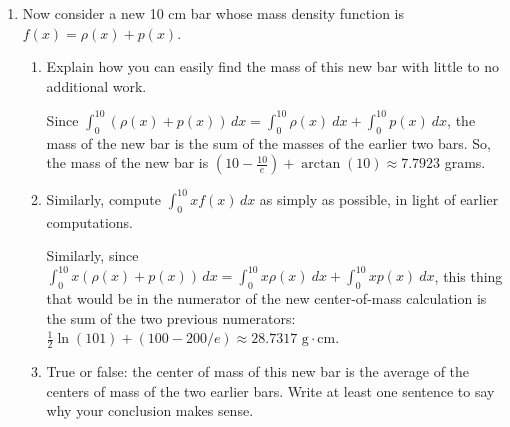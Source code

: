 \documentclass[10pt]{article}
\newenvironment{red}{\color{red}}{\ignorespacesafterend}
\begin{document}
\begin{enumerate}[leftmargin=0pt]
\begin{enumerate}
\begin{red}
    The center of mass of bar $p$ is
    \begin{align*}
        \frac{\int_0^{10}x\cdot e^{-0.1x}\, dx}{\int_0^{10} e^{-0.1x}\, dx} &= \frac{1}{10-10/e}\int_0^{10} x e^{-0.1x}\, dx \quad \text{(integration by parts)} \\
        &= \frac{1}{10-10/e}\left[-10xe^{-0.1x} - 100e^{-0.1x}\right|_0^{10} \\
        &= \frac{1}{10-10/e}
            [(-10\cdot 10 \cdot e^{-1} - 
            100\cdot e^{-1})-
            (-10\cdot 0 \cdot e^0 - 100e^0)] \\
        &= \frac{1}{10-10/e}\left[\frac{-100}{e} - \frac{100}{e} + 0 + 100\right] 
        = \frac{100 - 200/e}{10 - 10/e} \approx 4.1802\text{ cm}
    \end{align*}
    \end{red}
    \item Now consider a new 10 cm bar whose mass density function is $f(x) = \rho(x) + p(x)$.
    \begin{enumerate}
        \item Explain how you can easily find the mass of this new bar with little to no additional work.
        
        \begin{red}
        Since $\int_0^{10} (\rho(x) + p(x))\, dx = \int_0^{10} \rho(x)\ dx + \int_0^{10}p(x)\ dx$, the mass of the new bar is the sum of the masses of the earlier two bars. So, the mass of the new bar is $ \left(10 - \frac{10}{e}\right) + \arctan(10) \approx 7.7923$ grams.
        \end{red}
        \item Similarly, compute $\int_0^{10} x f(x)\, dx$ as simply as possible, in light of earlier computations.
        
        \begin{red}
        Similarly, since $\int_0^{10} x(\rho(x) + p(x))\, dx = \int_0^{10} x\rho(x)\ dx + \int_0^{10} x p(x)\ dx$, this thing that would be in the numerator of the new center-of-mass calculation is the sum of the two previous numerators: \\
        $\tfrac{1}{2} \ln(101) + (100 - 200/e) \approx 28.7317\text{ g} \cdot\text{cm}.$
        \end{red}
        \item True or false: the center of mass of this new bar is the average of the centers of mass of the two earlier bars. Write at least one sentence to say why your conclusion makes sense.
        

\end{enumerate}
\end{enumerate}
\end{enumerate}
\end{document}
